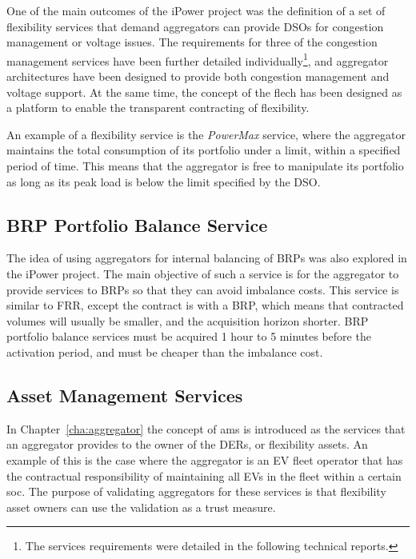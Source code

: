 One of the main outcomes of the iPower project was the definition of a set of flexibility services that demand aggregators can provide DSOs for congestion management or voltage issues. The requirements for three of the congestion management services have been further detailed individually\footnote{The services requirements were detailed in the following technical reports\cite{hansen2013flech,biegel2014flech,bondy2014flech}.}, and aggregator architectures have been designed to provide both congestion management and voltage support. At the same time, the concept of the \gls{flech} has been designed as a platform to enable the transparent contracting of flexibility.

An example of a flexibility service is the \emph{PowerMax} service, where the aggregator maintains the total consumption of its portfolio under a limit, within a specified period of time. This means that the aggregator is free to manipulate its portfolio as long as its peak load is below the limit specified by the DSO.
\subsection{BRP Portfolio Balance Service} %
\label{sub:BRPPortfolioBalance}
The idea of using aggregators for internal balancing of BRPs was also explored in the iPower project. The main objective of such a service is for the aggregator to provide services to BRPs so that they can avoid imbalance costs. This service is similar to FRR, except the contract is with a BRP, which means that contracted volumes will usually be smaller, and the acquisition horizon shorter. BRP portfolio balance services must be acquired 1 hour to 5 minutes before the activation period, and must be cheaper than the imbalance cost.

\subsection{Asset Management Services} %
\label{sub:assetmanagementservices}
In Chapter~\ref{cha:aggregator} the concept of \gls{ams} is introduced as the services that an aggregator provides to the owner of the DERs, or flexibility assets. An example of this is the case where the aggregator is an EV fleet operator that has the contractual responsibility of maintaining all EVs in the fleet within a certain \gls{soc}. The purpose of validating aggregators for these services is that flexibility asset owners can use the validation as a trust measure.

